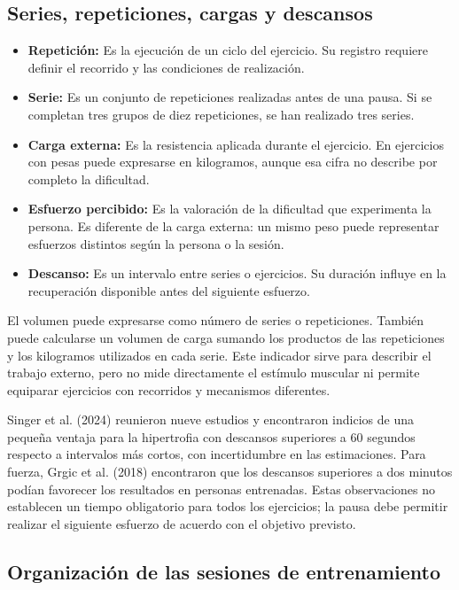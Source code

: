 \subsection{Series, repeticiones, cargas y descansos}

\begin{itemize}
    \item \textbf{Repetición:} Es la ejecución de un ciclo del ejercicio. Su registro requiere definir el recorrido y las condiciones de realización.
    \item \textbf{Serie:} Es un conjunto de repeticiones realizadas antes de una pausa. Si se completan tres grupos de diez repeticiones, se han realizado tres series.
    \item \textbf{Carga externa:} Es la resistencia aplicada durante el ejercicio. En ejercicios con pesas puede expresarse en kilogramos, aunque esa cifra no describe por completo la dificultad.
    \item \textbf{Esfuerzo percibido:} Es la valoración de la dificultad que experimenta la persona. Es diferente de la carga externa: un mismo peso puede representar esfuerzos distintos según la persona o la sesión.
    \item \textbf{Descanso:} Es un intervalo entre series o ejercicios. Su duración influye en la recuperación disponible antes del siguiente esfuerzo.
\end{itemize}

El volumen puede expresarse como número de series o repeticiones. También puede calcularse un volumen de carga sumando los productos de las repeticiones y los kilogramos utilizados en cada serie. Este indicador sirve para describir el trabajo externo, pero no mide directamente el estímulo muscular ni permite equiparar ejercicios con recorridos y mecanismos diferentes.

Singer et al. (2024) reunieron nueve estudios y encontraron indicios de una pequeña ventaja para la hipertrofia con descansos superiores a 60 segundos respecto a intervalos más cortos, con incertidumbre en las estimaciones. Para fuerza, Grgic et al. (2018) encontraron que los descansos superiores a dos minutos podían favorecer los resultados en personas entrenadas. Estas observaciones no establecen un tiempo obligatorio para todos los ejercicios; la pausa debe permitir realizar el siguiente esfuerzo de acuerdo con el objetivo previsto.

\subsection{Organización de las sesiones de entrenamiento}

